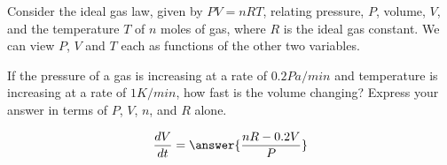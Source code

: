 \documentclass{ximera}
\author{David Guichard \and Neal Koblitz \and H. Jerome Keisler \and Albert Scheller \and Barry Balof \and Mike Wills \and Matthew Carr}
\begin{document}
\begin{exercise}




Consider the ideal gas law, given by $PV=nRT$, relating pressure, $P$, volume, $V$, and the temperature $T$ of $n$ moles of gas, where $R$ is the ideal gas constant. We can view $P$, $V$ and $T$ each as functions of the other two variables. 

If the pressure of a gas is increasing at a rate of $0.2\unit{Pa/min}$ and temperature is increasing at a rate of $1\unit{K/min}$, how fast is the volume changing? Express your answer in terms of $P$, $V$, $n$, and $R$ alone.

\begin{prompt}
\[
\frac{d V}{d t}=\answer{\frac{n R-0.2 V}{P}}
\]
\end{prompt}

\end{exercise}
\end{document}
